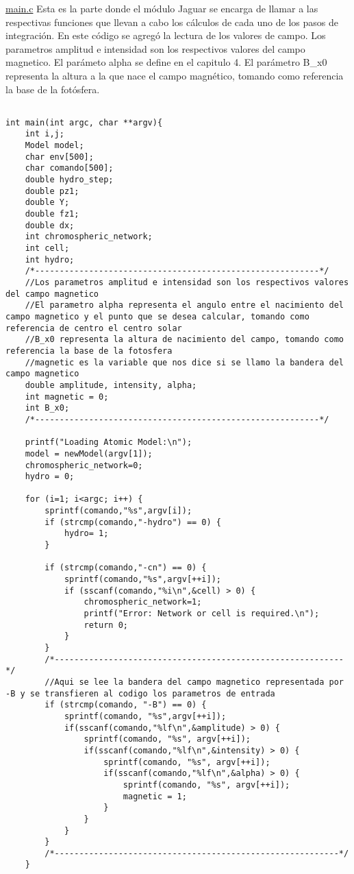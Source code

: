 \underline{main.c}
Esta es la parte donde el m\'odulo Jaguar se encarga de llamar a las respectivas funciones que llevan a cabo los c\'alculos de cada uno de los pasos de integraci\'on. En este c\'odigo se agreg\'o la lectura de los valores de campo.\newline
Los parametros amplitud e intensidad son los respectivos valores del campo magnetico.\newline
El par\'ameto alpha se define en el capitulo 4.\newline
El par\'ametro B\_x0 representa la altura a la que nace el campo magn\'etico, tomando como referencia la base de la fot\'osfera.
\begin{lstlisting}[style=CStyle]

int main(int argc, char **argv){
	int i,j;
	Model model;
	char env[500];
	char comando[500];
	double hydro_step;
	double pz1;
	double Y;
	double fz1;
	double dx;
	int chromospheric_network;
	int cell;
	int hydro;
	/*----------------------------------------------------------*/
	//Los parametros amplitud e intensidad son los respectivos valores del campo magnetico
	//El parametro alpha representa el angulo entre el nacimiento del campo magnetico y el punto que se desea calcular, tomando como referencia de centro el centro solar
	//B_x0 representa la altura de nacimiento del campo, tomando como referencia la base de la fotosfera
	//magnetic es la variable que nos dice si se llamo la bandera del campo magnetico
	double amplitude, intensity, alpha;
	int magnetic = 0;
	int B_x0;
	/*----------------------------------------------------------*/

	printf("Loading Atomic Model:\n");
	model = newModel(argv[1]);
	chromospheric_network=0;
	hydro = 0;

	for (i=1; i<argc; i++) {
		sprintf(comando,"%s",argv[i]);
		if (strcmp(comando,"-hydro") == 0) {
			hydro= 1;
		}

		if (strcmp(comando,"-cn") == 0) {
			sprintf(comando,"%s",argv[++i]);
			if (sscanf(comando,"%i\n",&cell) > 0) {
				chromospheric_network=1;
				printf("Error: Network or cell is required.\n");
				return 0;
			}
		}
		/*-----------------------------------------------------------*/	
		//Aqui se lee la bandera del campo magnetico representada por -B y se transfieren al codigo los parametros de entrada
		if (strcmp(comando, "-B") == 0) {
			sprintf(comando, "%s",argv[++i]);
			if(sscanf(comando,"%lf\n",&amplitude) > 0) {
				sprintf(comando, "%s", argv[++i]);
				if(sscanf(comando,"%lf\n",&intensity) > 0) {
					sprintf(comando, "%s", argv[++i]);
					if(sscanf(comando,"%lf\n",&alpha) > 0) {
						sprintf(comando, "%s", argv[++i]);
						magnetic = 1;
					}
				}
			}
		}
		/*----------------------------------------------------------*/	
	}


\end{lstlisting}
